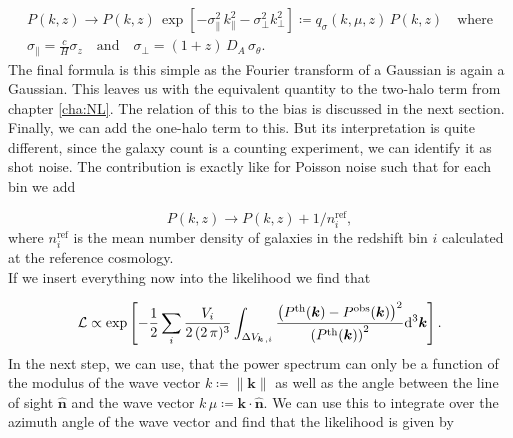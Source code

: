 \documentclass[../main.tex]{subfiles}
\begin{document}
\begin{align}
    P(k,z) \to P(k,z)\,\exp\left[- \sigma_\|^2 \, k_\|^2 - \sigma_\perp^2 k_\perp^2 \right]\coloneq q_\sigma(k,\mu,z)\,P(k,z)\quad \text{where} \\
    \sigma_\| = \frac{c}{H} \sigma_z \quad \text{and} \quad \sigma_\perp = (1+z)\,D_A \, \sigma_\theta. \nonumber
\end{align}
The final formula is this simple as the Fourier transform of a Gaussian is again a Gaussian. This leaves us with the equivalent quantity to the two-halo term from chapter \ref{cha:NL}. The relation of this to the bias is discussed in the next section.
Finally, we can add the one-halo term to this. But its interpretation is quite different, since the galaxy count is a counting experiment, we can identify it as shot noise. The contribution is exactly like for Poisson noise such that for each bin we add 

\begin{equation}
    P(k,z) \to P(k,z) + 1/n_i^\mathrm{ref},
\end{equation}  
where $n_i^\mathrm{ref}$ is the mean number density of galaxies in the redshift bin $i$ calculated at the reference cosmology.\\
 If we insert everything now into the likelihood we find that 
 
 \begin{equation}
    \mathcal{L} \propto \exp\left[-\frac{1}{2} \sum_i \frac{V_i}{2\,(2\,\pi)^3} \int_{\Delta V_{\boldsymbol{k}\,,i}} \frac{\left(P^\mathrm{th}(\boldsymbol{k})-P^\mathrm{obs}(\boldsymbol{k})\right)^2}{\left(P^\mathrm{th}(\boldsymbol{k})\right)^2} \mathrm{d}^3 \boldsymbol{k} \right].
 \end{equation}
 In the next step, we can use, that the power spectrum can only be a function of the modulus of the wave vector $k \coloneq \|\boldsymbol{k}\|$ as well as the angle between the line of sight $\hat{\boldsymbol{n}}$ and the wave vector $k \,\mu \coloneq \boldsymbol{k} \cdot \hat{\boldsymbol{n}}$. We can use this to integrate over the azimuth angle of the wave vector and find that the likelihood is given by
 
\end{document}
